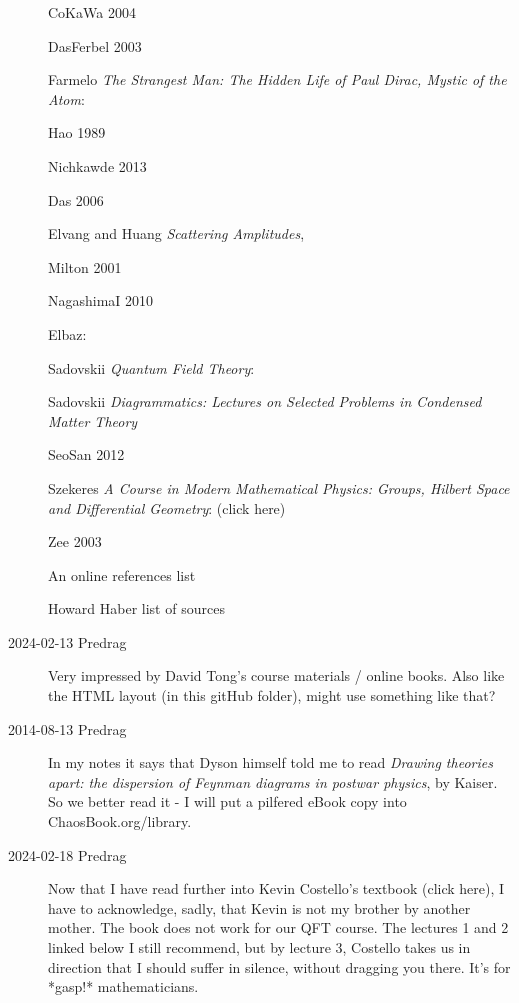 \begin{description}
CoKaWa 2004 

DasFerbel 2003 

Farmelo
{\em The Strangest Man: The Hidden Life of Paul Dirac, Mystic of the Atom}:

Hao 1989 

Nichkawde 2013 

Das 2006 

Elvang and Huang {\em Scattering Amplitudes}, 

Milton 2001 

NagashimaI 2010 

Elbaz: 

Sadovskii {\em Quantum Field Theory}:

Sadovskii
{\em Diagrammatics: Lectures on Selected Problems in Condensed Matter Theory}

SeoSan 2012 

Szekeres {\em A Course in Modern Mathematical Physics: Groups,
Hilbert Space and Differential Geometry}:
 { (click here)}

Zee 2003 

{An online references list}

Howard Haber  {list of sources}

\item[2024-02-13 Predrag]
Very impressed by 
{David Tong}'s course materials / 
{online books}. 
Also like the HTML layout (in this gitHub folder), might use something like that?

\item[2014-08-13 Predrag]
In my notes it says that Dyson himself told me to read {\em Drawing
theories apart: the dispersion of {Feynman} diagrams in postwar physics},
by Kaiser. So we better read it - I will put a pilfered
eBook copy 
into ChaosBook.org/library.

\item[2024-02-18 Predrag] Now that I have read further into
Kevin Costello's textbook
{(click here)},
I have to acknowledge, sadly, that Kevin is not my brother by another
mother. The book does not work for our QFT course. The lectures 1 and 2
linked below I still recommend, but by lecture 3, Costello takes us in
direction that I should suffer in silence, without dragging you there. It's for
*gasp!* mathematicians.


\end{description}
